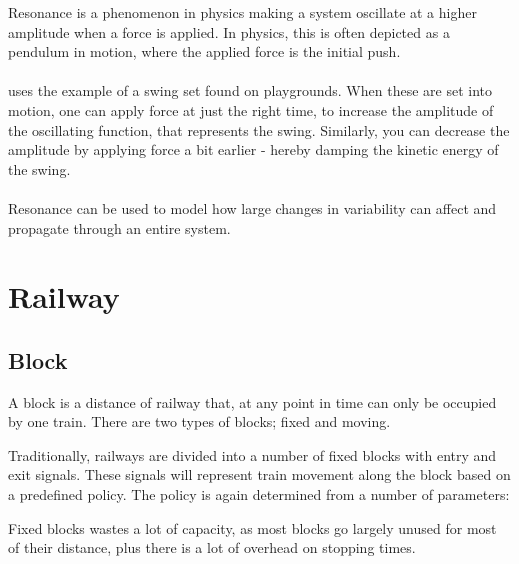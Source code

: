 Resonance is a phenomenon in physics making a system oscillate at a higher amplitude when a force is applied. In physics, this is often depicted as a pendulum in motion, where the applied force is the initial push.\\
\\
\cite{hollnagel2004barriers} uses the example of a swing set found on playgrounds. When these are set into motion, one can apply force at just the right time, to increase the amplitude of the oscillating function, that represents the swing. Similarly, you can decrease the amplitude by applying force a bit earlier - hereby damping the kinetic energy of the swing.\\
\\
Resonance can be used to model how large changes in variability can affect and propagate through an entire system. 

\section{Railway}


\subsection{Block}
A block is a distance of railway that, at any point in time can only be occupied by one train. There are two types of blocks; fixed and moving.

Traditionally, railways are divided into a number of fixed blocks with entry and exit signals. These signals will represent train movement along the block based on a predefined policy. The policy is again determined from a number of parameters:






Fixed blocks wastes a lot of capacity, as most blocks go largely unused for most of their distance, plus there is a lot of overhead on stopping times.

